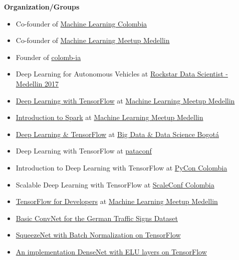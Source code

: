 
\textbf{Organization/Groups}
\begin{itemize}
\tightlist
\item
  Co-founder of
  \href{https://www.facebook.com/groups/1766056600304468}{Machine
  Learning Colombia}
\item
  Co-founder of \href{https://www.meetup.com/es-ES/ml-medellin}{Machine
  Learning Meetup Medellin}
\item
  Founder of
  \href{https://github.com/colomb-ia/mision-vision}{colomb-ia}
\end{itemize}

\begin{itemize}
\tightlist
\item
  Deep Learning for Autonomous Vehicles at \href{https://www.ticketcode.co/eventos/rockstar-s-data-scientist-2017}{Rockstar Data Scientist - Medellin 2017}
\item
  \href{https://www.meetup.com/es-ES/ml-medellin/events/231887878/}{Deep
  Learning with TensorFlow} at
  \href{https://www.meetup.com/es-ES/ml-medellin}{Machine Learning
  Meetup Medellin}
\item
  \href{https://www.meetup.com/es-ES/ml-medellin/events/232587669/}{Introduction
  to Spark} at \href{https://www.meetup.com/es-ES/ml-medellin}{Machine
  Learning Meetup Medellin}
\item
  \href{https://www.meetup.com/es-ES/Big-Data-Science-Bogota/events/233975872}{Deep
  Learning \& TensorFlow} at
  \href{https://www.meetup.com/es-ES/Big-Data-Science-Bogota/}{Big Data
  \& Data Science Bogotá}
\item
  Deep Learning with TensorFlow at \href{http://pataconf.com/}{pataconf}
\item
  Introduction to Deep Learning with TensorFlow at
  \href{http://www.pycon.co/}{PyCon Colombia}
\item
  Scalable Deep Learning with TensorFlow at
  \href{http://scaleconfco.com/}{ScaleConf Colombia}
\item
  \href{https://www.meetup.com/es-ES/ml-medellin/events/238072044/}{TensorFlow
  for Developers} at
  \href{https://www.meetup.com/es-ES/ml-medellin}{Machine Learning
  Meetup Medellin}
\end{itemize}


\begin{itemize}
\tightlist
\item
  \href{https://github.com/cgarciae/supervised-avanzado-german-traffic-signs/tree/feature/solucion-basica}{Basic
  ConvNet for the German Traffic Signs Dataset}
\item
  \href{https://github.com/cgarciae/supervised-avanzado-german-traffic-signs/tree/feature/batch-norm-squeeze-net}{SqueezeNet
  with Batch Normalization on TensorFlow}
\item
  \href{https://github.com/cgarciae/supervised-avanzado-german-traffic-signs/tree/feature/dense-net-elu-2}{An
  implementation DenseNet with ELU layers on TensorFlow}
\end{itemize}
